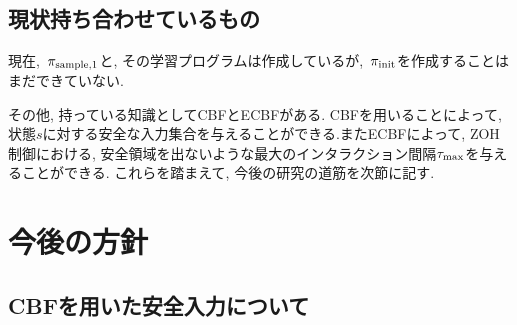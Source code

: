\documentclass{jsarticle}
\begin{document}
\subsection{現状持ち合わせているもの}
現在,~$\pi_{\rm{sample},1}$と, その学習プログラムは作成しているが,~$\pi_{\rm{init}}$を作成することはまだできていない. \par
その他, 持っている知識としてCBFとECBF\cite{ECBF}がある. 
 CBFを用いることによって, 状態$s$に対する安全な入力集合を与えることができる.またECBFによって, ZOH制御における, 安全領域を出ないような最大のインタラクション間隔$\tau_{\rm{max}}$を与えることができる.
これらを踏まえて, 今後の研究の道筋を次節に記す.

\section{今後の方針}
\subsection{CBFを用いた安全入力について}
\end{document}

